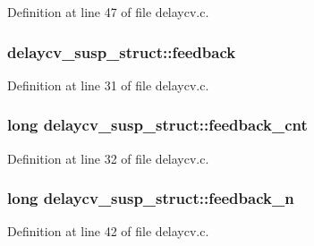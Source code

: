 Definition at line 47 of file delaycv.\+c.

\subsubsection[{\texorpdfstring{feedback}{feedback}}]{ delaycv\+\_\+susp\+\_\+struct\+::feedback}\hypertarget{structdelaycv__susp__struct_a27f5491dcf88af0e498a9b9e7769b520}{}\label{structdelaycv__susp__struct_a27f5491dcf88af0e498a9b9e7769b520}


Definition at line 31 of file delaycv.\+c.

\subsubsection[{\texorpdfstring{feedback\+\_\+cnt}{feedback_cnt}}]{\setlength{\rightskip}{0pt plus 5cm}long delaycv\+\_\+susp\+\_\+struct\+::feedback\+\_\+cnt}\hypertarget{structdelaycv__susp__struct_a2a1342084d482cc8438ee1e00500a4ec}{}\label{structdelaycv__susp__struct_a2a1342084d482cc8438ee1e00500a4ec}


Definition at line 32 of file delaycv.\+c.

\subsubsection[{\texorpdfstring{feedback\+\_\+n}{feedback_n}}]{\setlength{\rightskip}{0pt plus 5cm}long delaycv\+\_\+susp\+\_\+struct\+::feedback\+\_\+n}\hypertarget{structdelaycv__susp__struct_ad302c68fb9226c958b4d7908a09526e2}{}\label{structdelaycv__susp__struct_ad302c68fb9226c958b4d7908a09526e2}


Definition at line 42 of file delaycv.\+c.

